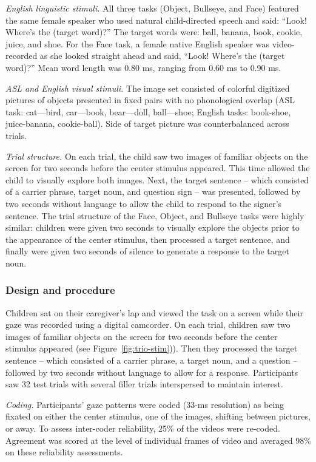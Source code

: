 \documentclass[english,floatsintext,man]{apa6}
\begin{document}
\emph{English linguistic stimuli.} All three tasks (Object, Bullseye,
and Face) featured the same female speaker who used natural
child-directed speech and said: \enquote{Look! Where's the (target
word)?} The target words were: ball, banana, book, cookie, juice, and
shoe. For the Face task, a female native English speaker was
video-recorded as she looked straight ahead and said, \enquote{Look!
Where's the (target word)?} Mean word length was 0.80 ms, ranging from
0.60 ms to 0.90 ms.

\emph{ASL and English visual stimuli.} The image set consisted of
colorful digitized pictures of objects presented in fixed pairs with no
phonological overlap (ASL task: cat---bird, car---book, bear---doll,
ball---shoe; English tasks: book-shoe, juice-banana, cookie-ball). Side
of target picture was counterbalanced across trials.

\emph{Trial structure.} On each trial, the child saw two images of
familiar objects on the screen for two seconds before the center
stimulus appeared. This time allowed the child to visually explore both
images. Next, the target sentence -- which consisted of a carrier
phrase, target noun, and question sign -- was presented, followed by two
seconds without language to allow the child to respond to the signer's
sentence. The trial structure of the Face, Object, and Bullseye tasks
were highly similar: children were given two seconds to visually explore
the objects prior to the appearance of the center stimulus, then
processed a target sentence, and finally were given two seconds of
silence to generate a response to the target noun.

\hypertarget{design-and-procedure}{%
\subsubsection{Design and procedure}\label{design-and-procedure}}

Children sat on their caregiver's lap and viewed the task on a screen
while their gaze was recorded using a digital camcorder. On each trial,
children saw two images of familiar objects on the screen for two
seconds before the center stimulus appeared (see
Figure~\ref{fig:trio-stim})). Then they processed the target sentence --
which consisted of a carrier phrase, a target noun, and a question --
followed by two seconds without language to allow for a response.
Participants saw 32 test trials with several filler trials interspersed
to maintain interest.

\emph{Coding.} Participants' gaze patterns were coded (33-ms resolution)
as being fixated on either the center stimulus, one of the images,
shifting between pictures, or away. To assess inter-coder reliability,
25\% of the videos were re-coded. Agreement was scored at the level of
individual frames of video and averaged 98\% on these reliability
assessments.
\end{document}
